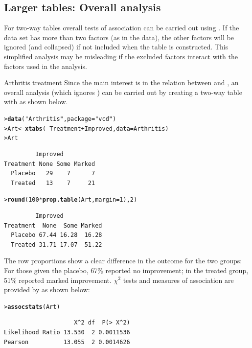 \documentclass[10pt,krantz2]{krantz}\usepackage[]{graphicx}\usepackage[]{color}
\makeatletter
\newcommand{\hlnum}[1]{\textcolor[rgb]{0.686,0.059,0.569}{#1}}%
\newcommand{\hlstr}[1]{\textcolor[rgb]{0.192,0.494,0.8}{#1}}%
\newcommand{\hlopt}[1]{\textcolor[rgb]{0,0,0}{#1}}%
\newcommand{\hlstd}[1]{\textcolor[rgb]{0.345,0.345,0.345}{#1}}%
\newcommand{\hlkwb}[1]{\textcolor[rgb]{0.69,0.353,0.396}{#1}}%
\newcommand{\hlkwc}[1]{\textcolor[rgb]{0.333,0.667,0.333}{#1}}%
\newcommand{\hlkwd}[1]{\textcolor[rgb]{0.737,0.353,0.396}{\textbf{#1}}}%
\newenvironment{kframe}{%
 \def\at@end@of@kframe{}%
 \ifinner\ifhmode%
  \def\at@end@of@kframe{\end{minipage}}%
  \begin{minipage}{\columnwidth}%
 \fi\fi%
 \def\FrameCommand##1{\hskip\@totalleftmargin \hskip-\fboxsep
 \colorbox{shadecolor}{##1}\hskip-\fboxsep
     \hskip-\linewidth \hskip-\@totalleftmargin \hskip\columnwidth}%
 \MakeFramed {\advance\hsize-\width
   \@totalleftmargin\z@ \linewidth\hsize
   \@setminipage}}%
 {\par\unskip\endMakeFramed%
 \at@end@of@kframe}
\newenvironment{knitrout}{}{} %
\renewenvironment{knitrout}{\small\renewcommand{\baselinestretch}{.85}}{} %
\makeatother
\begin{document}
\subsection{Larger tables: Overall analysis}\label{sec:twoway-overall}

For two-way tables overall tests of association can be carried out
using .
If the data set has more than two factors (as in the
 data), the other factors will be
ignored (and collapsed) if not included when the table is constructed.
This simplified analysis may be misleading if
the excluded factors interact with the factors used in the
analysis.

\begin{Example}[arthrit2]{Arthritis treatment}
Since the main interest is in the relation between  and
, an overall analysis (which ignores ) can be carried out
by creating a two-way table with 
as shown below.
\begin{knitrout}
\color{fgcolor}\begin{kframe}
\begin{alltt}
\hlstd{> }\hlkwd{data}\hlstd{(}\hlstr{"Arthritis"}\hlstd{,} \hlkwc{package} \hlstd{=} \hlstr{"vcd"}\hlstd{)}
\hlstd{> }\hlstd{Art} \hlkwb{<-} \hlkwd{xtabs}\hlstd{(}\hlopt{~} \hlstd{Treatment} \hlopt{+} \hlstd{Improved,} \hlkwc{data} \hlstd{= Arthritis)}
\hlstd{> }\hlstd{Art}
\end{alltt}
\begin{verbatim}
         Improved
Treatment None Some Marked
  Placebo   29    7      7
  Treated   13    7     21
\end{verbatim}
\begin{alltt}
\hlstd{> }\hlkwd{round}\hlstd{(}\hlnum{100} \hlopt{*} \hlkwd{prop.table}\hlstd{(Art,} \hlkwc{margin} \hlstd{=} \hlnum{1}\hlstd{),} \hlnum{2}\hlstd{)}
\end{alltt}
\begin{verbatim}
         Improved
Treatment  None  Some Marked
  Placebo 67.44 16.28  16.28
  Treated 31.71 17.07  51.22
\end{verbatim}
\end{kframe}
\end{knitrout}
The row proportions show a clear difference in the outcome for the two groups:
For those given the placebo, 67\% reported no improvement;
in the treated group, 51\% reported marked improvement.  $\chi^2$ tests
and measures of association are provided by  as shown below:
\begin{knitrout}
\color{fgcolor}\begin{kframe}
\begin{alltt}
\hlstd{> }\hlkwd{assocstats}\hlstd{(Art)}
\end{alltt}
\begin{verbatim}
                    X^2 df  P(> X^2)
Likelihood Ratio 13.530  2 0.0011536
Pearson          13.055  2 0.0014626


\end{verbatim}
\end{kframe}
\end{knitrout}
\end{Example}
\end{document}
